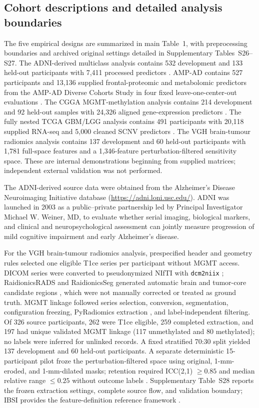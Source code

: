 \subsection{Cohort descriptions and detailed analysis boundaries}

The five empirical designs are summarized in main Table~1, with preprocessing boundaries and archived original settings detailed in Supplementary Tables~S26--S27. The ADNI-derived multiclass analysis contains 532 development and 133 held-out participants with 7,411 processed predictors \citep{ref20,ref21}. AMP-AD contains 527 participants and 13,136 supplied frontal-proteomic and metabolomic predictors from the AMP-AD Diverse Cohorts Study in four fixed leave-one-center-out evaluations \citep{ref37}. The CGGA MGMT-methylation analysis contains 214 development and 92 held-out samples with 24,326 aligned gene-expression predictors \citep{ref23}. The fully nested TCGA GBM/LGG analysis contains 491 participants with 20,118 supplied RNA-seq and 5,000 cleaned SCNV predictors \citep{ref44,ref45}. The VGH brain-tumour radiomics analysis contains 137 development and 60 held-out participants with 1,781 full-space features and a 1,346-feature perturbation-filtered sensitivity space. These are internal demonstrations beginning from supplied matrices; independent external validation was not performed.

The ADNI-derived source data were obtained from the Alzheimer's Disease Neuroimaging Initiative database (\url{https://adni.loni.usc.edu/}). ADNI was launched in 2003 as a public--private partnership led by Principal Investigator Michael W. Weiner, MD, to evaluate whether serial imaging, biological markers, and clinical and neuropsychological assessment can jointly measure progression of mild cognitive impairment and early Alzheimer's disease.

For the VGH brain-tumour radiomics analysis, prespecified header and geometry rules selected one eligible T1ce series per participant without MGMT access. DICOM series were converted to pseudonymized NIfTI with \texttt{dcm2niix} \citep{ref51}; RaidionicsRADS and RaidionicsSeg generated automatic brain and tumor-core candidate regions \citep{ref50}, which were not manually corrected or treated as ground truth. MGMT linkage followed series selection, conversion, segmentation, configuration freezing, PyRadiomics extraction \citep{ref43}, and label-independent filtering. Of 326 source participants, 262 were T1ce eligible, 259 completed extraction, and 197 had unique validated MGMT linkage (117 unmethylated and 80 methylated); no labels were inferred for unlinked records. A fixed stratified 70:30 split yielded 137 development and 60 held-out participants. A separate deterministic 15-participant pilot froze the perturbation-filtered space using original, 1-mm-eroded, and 1-mm-dilated masks; retention required ICC(2,1) \(\geq0.85\) and median relative range \(\leq0.25\) without outcome labels \citep{ref41}. Supplementary Table~S28 reports the frozen extraction settings, complete source flow, and validation boundary; IBSI provides the feature-definition reference framework \citep{ref42}.


